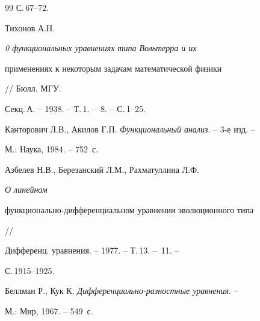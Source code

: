 \begin{thebibliography}{99}
С.\,67--72. 




Тихонов А.Н. {\em 0 функциональных уравнениях типа Вольтерра и их 


применениях к некоторым задачам математической физики} // Бюлл. МГУ. 


Секц.\,А. -- 1938. -- Т.\,1. -- \No\,8. -- С.\,1--25. 




Канторович Л.В., Акилов Г.П. {\em Функциональный анализ}. -- 3-е изд. -- 


М.: Наука, 1984. -- 752~с. 




Азбелев Н.В., Березанский Л.М., Рахматуллина Л.Ф. {\em О линейном 


функционально-дифференциальном уравнении эволюционного типа} // 


Дифференц. уравнения. -- 1977. -- Т.\,13. -- \No\,11. -- 


С.\,1915--1925. 




Беллман Р., Кук К. {\em Дифференциально-разностные уравнения}. -- 


М.: Мир, 1967. -- 549~с. 


 


\end{thebibliography} 


 


\vskip 2cm 


 






\label{end} 


 



